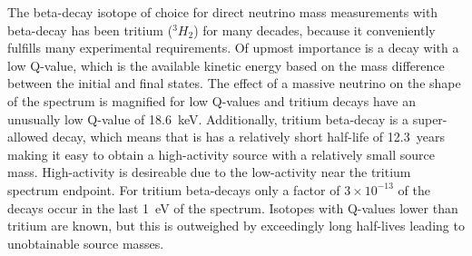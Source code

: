 The beta-decay isotope of choice for direct neutrino mass measurements with beta-decay has been tritium ($^3H_2$) for many decades, because it conveniently fulfills many experimental requirements. Of upmost importance is a decay with a low Q-value, which is the available kinetic energy based on the mass difference between the initial and final states. The effect of a massive neutrino on the shape of the spectrum is magnified for low Q-values and tritium decays have an unusually low Q-value of 18.6~keV. Additionally, tritium beta-decay is a super-allowed decay, which means that is has a relatively short half-life of 12.3~years making it easy to obtain a high-activity source with a relatively small source mass. High-activity is desireable due to the low-activity near the tritium spectrum endpoint. For tritium beta-decays only a factor of $3\times10^{-13}$ of the decays occur in the last 1~eV of the spectrum. Isotopes with Q-values lower than tritium are known, but this is outweighed by exceedingly long half-lives leading to unobtainable source masses.

